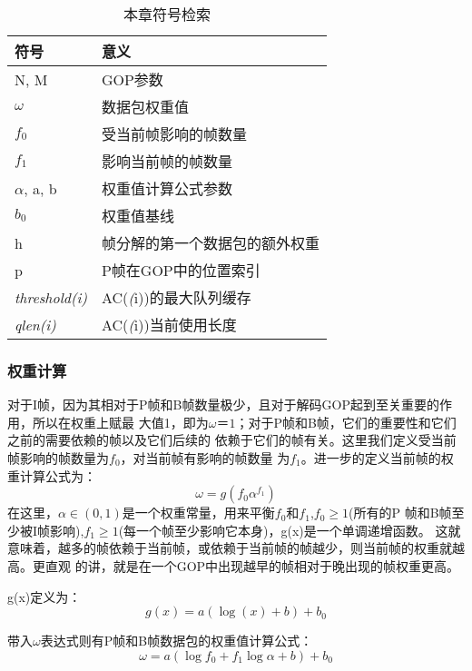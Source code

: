 \begin{table}[htbp]
  \centering
  \caption{本章符号检索}
  \label{tab:notations}
  \begin{tabular}{p{3cm}p{8cm}}
  \hline
  符号 & 意义 \\
  \hline
  N, M &  GOP参数 \\
  $\omega$ &  数据包权重值 \\
  $f_{0}$ & 受当前帧影响的帧数量 \\
  $f_{1}$ & 影响当前帧的帧数量 \\
  $\alpha$, a, b & 权重值计算公式参数 \\
  $b_{0}$ & 权重值基线 \\
  h & 帧分解的第一个数据包的额外权重 \\
  p & P帧在GOP中的位置索引 \\
  \emph{threshold(i)} & AC(\emph(i))的最大队列缓存 \\
  \emph{qlen(i)} & AC(\emph(i))当前使用长度 \\
  \hline
  \end{tabular}
\end{table}

\renewcommand{\thesubsubsection}{\Alph{subsubsection}.}
\subsubsection{权重计算}
对于I帧，因为其相对于P帧和B帧数量极少，且对于解码GOP起到至关重要的作用，所以在权重上赋最
大值1，即为$\omega ＝1$；对于P帧和B帧，它们的重要性和它们之前的需要依赖的帧以及它们后续的
依赖于它们的帧有关。这里我们定义受当前帧影响的帧数量为$f_{0}$，对当前帧有影响的帧数量
为$f_{1}$。进一步的定义当前帧的权重计算公式为：
\begin{equation}
\omega = g(f_{0}\alpha^{f_{1}})
\end{equation}
在这里，$\alpha \in (0,1)$是一个权重常量，用来平衡$f_{0}$和$f_{1}$,$f_{0}\geq1$(所有的P
帧和B帧至少被I帧影响),$f_{1}\geq1$(每一个帧至少影响它本身)，g(x)是一个单调递增函数。
这就意味着，越多的帧依赖于当前帧，或依赖于当前帧的帧越少，则当前帧的权重就越高。更直观
的讲，就是在一个GOP中出现越早的帧相对于晚出现的帧权重更高。

g(x)定义为：
\begin{equation}
g(x) = a(\log (x) + b) + b_{0}
\end{equation}

带入$\omega$表达式则有P帧和B帧数据包的权重值计算公式：
\begin{equation}
\label{equ:omega}
\omega = a(\log f_{0} + f_{1}\log \alpha + b) + b_{0}
\end{equation}

